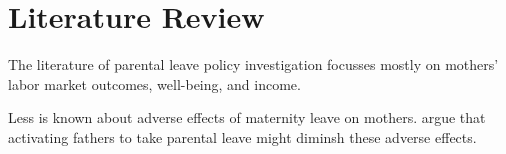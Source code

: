 \section{Literature Review}

The literature of parental leave policy investigation focusses mostly on mothers' labor market outcomes, well-being, and income.


Less is known about adverse effects of maternity leave on mothers. \citet{canaanMaternityLeavePaternity2022} argue that activating fathers to take parental leave might diminsh these adverse effects.


